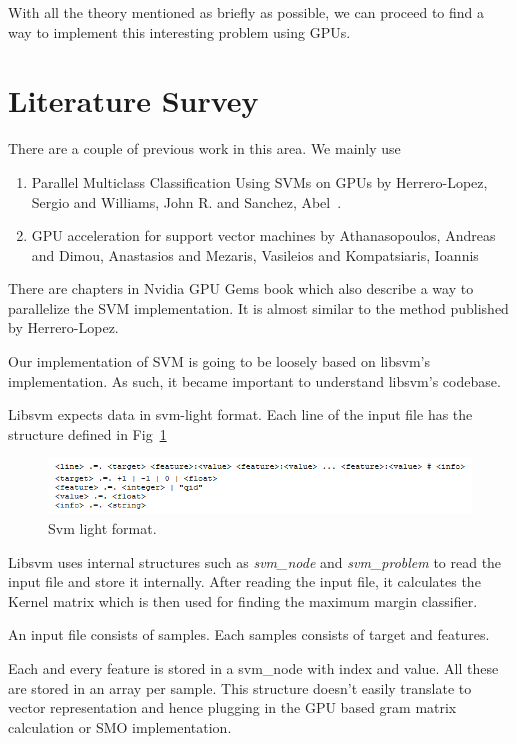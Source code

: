 \documentclass{article}
\begin{document}
With all the theory mentioned as briefly as possible, we can proceed to find a way to implement this interesting problem using GPUs.

\section{Literature Survey}
There are a couple of previous work in this area.  We mainly use
\begin{enumerate}
    \item Parallel Multiclass Classification Using SVMs on GPUs by Herrero-Lopez, Sergio and Williams, John R. and Sanchez, Abel~\cite{Herrero-Lopez:2010:PMC:1735688.1735692}.
    \item GPU acceleration for support vector machines by Athanasopoulos, Andreas and Dimou, Anastasios and Mezaris, Vasileios and Kompatsiaris, Ioannis~\cite{athanasopoulos2011gpu}
\end{enumerate}

There are chapters in Nvidia GPU Gems book which also describe a way to parallelize the SVM implementation.  It is almost similar to the method published by Herrero-Lopez.

Our implementation of SVM is going to be loosely based on libsvm's implementation.  As such, it became important to understand libsvm's codebase.

Libsvm expects data in svm-light format.  Each line of the input file has the structure defined in Fig~\ref{fig:svmlight}

\begin{figure}[ht!]
  \centering
  \includegraphics[width=1\textwidth]{images/svmlight}
  \caption{Svm light format.\label{fig:svmlight}}
\end{figure}

Libsvm uses internal structures such as \textit{svm\_node} and \textit{svm\_problem} to read the input file and store it internally.
After reading the input file, it calculates the Kernel matrix which is then used for finding the maximum margin classifier.

An input file consists of samples.  
Each samples consists of target and features.

Each and every feature is stored in a svm\_node with index and value.
All these are stored in an array per sample.
This structure doesn't easily translate to vector representation and hence plugging in the GPU based gram matrix calculation or SMO implementation.
\end{document}
